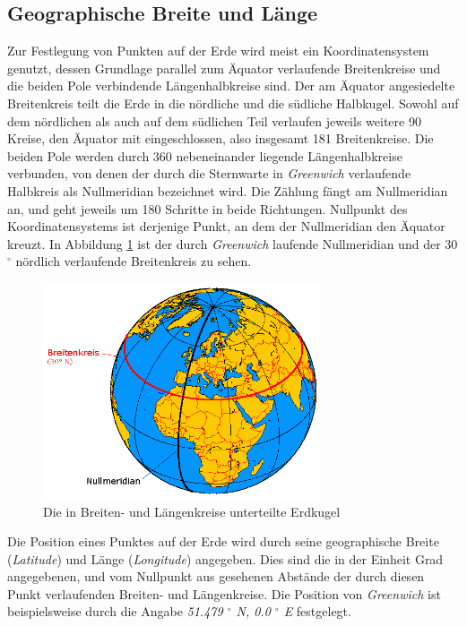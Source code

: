 \subsection{Geographische Breite und Länge}
Zur Festlegung von Punkten auf der Erde wird meist ein
Koordinatensystem genutzt, dessen Grundlage parallel zum Äquator
verlaufende Breitenkreise und die beiden Pole verbindende
Längenhalbkreise sind. Der am Äquator angesiedelte Breitenkreis teilt
die Erde in die nördliche und die südliche Halbkugel. Sowohl auf dem
nördlichen als auch auf dem südlichen Teil verlaufen jeweils weitere
90 Kreise, den Äquator mit eingeschlossen, also insgesamt 181
Breitenkreise. Die beiden Pole werden durch 360 nebeneinander liegende
Längenhalbkreise verbunden, von denen der durch die Sternwarte in
\textit{Greenwich} verlaufende Halbkreis als Nullmeridian bezeichnet
wird. Die Zählung fängt am Nullmeridian an, und geht jeweils um 180
Schritte in beide Richtungen. Nullpunkt des Koordinatensystems ist
derjenige Punkt, an dem der Nullmeridian den Äquator kreuzt. In
Abbildung \ref{koordinaten} ist der durch \textit{Greenwich} laufende
Nullmeridian und der 30 $^\circ$ nördlich verlaufende Breitenkreis zu
sehen.

\begin{figure}[h]
  \includegraphics[width=310px]{bilder/koordinaten}
  \caption{Die in Breiten- und Längenkreise unterteilte Erdkugel}
  \label{koordinaten}
\end{figure}

Die Position eines Punktes auf der Erde wird durch seine geographische
Breite (\textit{Latitude}) und Länge (\textit{Longitude})
angegeben. Dies sind die in der Einheit Grad angegebenen, und vom
Nullpunkt aus gesehenen Abstände der durch diesen Punkt verlaufenden
Breiten- und Längenkreise. Die Position von \textit{Greenwich} ist
beispielsweise durch die Angabe \textit{51.479 $^\circ$ N, 0.0
  $^\circ$ E} festgelegt.


